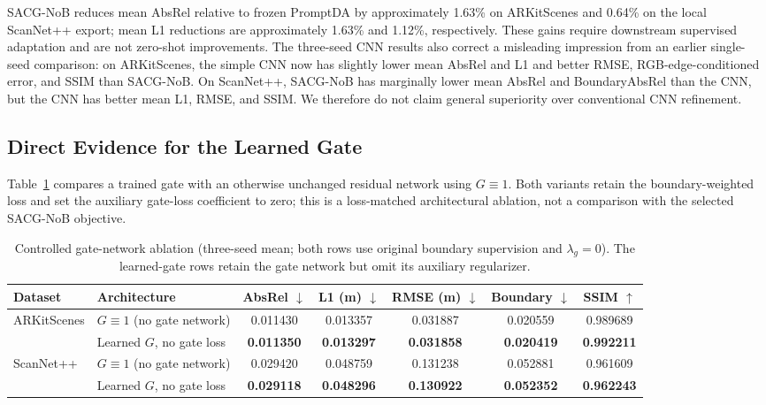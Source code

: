 SACG-NoB reduces mean AbsRel relative to frozen PromptDA by approximately 1.63\% on ARKitScenes and 0.64\% on the local ScanNet++ export; mean L1 reductions are approximately 1.63\% and 1.12\%, respectively. These gains require downstream supervised adaptation and are not zero-shot improvements. The three-seed CNN results also correct a misleading impression from an earlier single-seed comparison: on ARKitScenes, the simple CNN now has slightly lower mean AbsRel and L1 and better RMSE, RGB-edge-conditioned error, and SSIM than SACG-NoB. On ScanNet++, SACG-NoB has marginally lower mean AbsRel and BoundaryAbsRel than the CNN, but the CNN has better mean L1, RMSE, and SSIM. We therefore do not claim general superiority over conventional CNN refinement.

\subsection{Direct Evidence for the Learned Gate}
Table~\ref{tab:gate_ablation} compares a trained gate with an otherwise unchanged residual network using $G\equiv1$. Both variants retain the boundary-weighted loss and set the auxiliary gate-loss coefficient to zero; this is a loss-matched architectural ablation, not a comparison with the selected SACG-NoB objective.

\begin{table}[t]
\caption{Controlled gate-network ablation (three-seed mean; both rows use original boundary supervision and $\lambda_g=0$). The learned-gate rows retain the gate network but omit its auxiliary regularizer.}
\label{tab:gate_ablation}
\centering\small
\begin{tabular}{llccccc}
\toprule
Dataset & Architecture & AbsRel $\downarrow$ & L1 (m) $\downarrow$ & RMSE (m) $\downarrow$ & Boundary $\downarrow$ & SSIM $\uparrow$\\
\midrule
ARKitScenes & $G\equiv1$ (no gate network) & 0.011430 & 0.013357 & 0.031887 & 0.020559 & 0.989689\\
& Learned $G$, no gate loss & \textbf{0.011350} & \textbf{0.013297} & \textbf{0.031858} & \textbf{0.020419} & \textbf{0.992211}\\
\midrule
ScanNet++ & $G\equiv1$ (no gate network) & 0.029420 & 0.048759 & 0.131238 & 0.052881 & 0.961609\\
& Learned $G$, no gate loss & \textbf{0.029118} & \textbf{0.048296} & \textbf{0.130922} & \textbf{0.052352} & \textbf{0.962243}\\
\bottomrule
\end{tabular}
\end{table}

